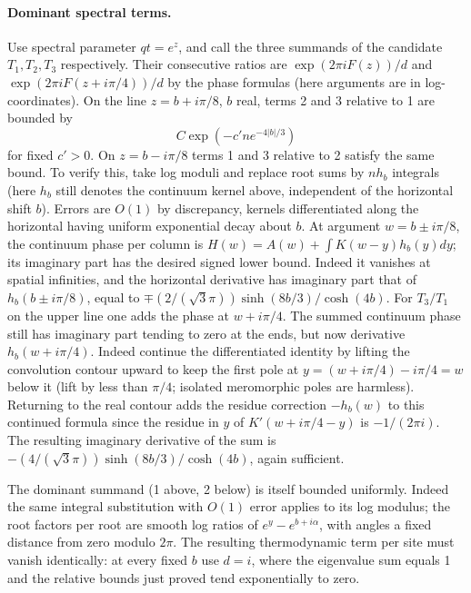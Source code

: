 \documentclass[11pt]{article}
\numberwithin{equation}{section}
\theoremstyle{definition}\newtheorem{definition}[theorem]{Definition}
\theoremstyle{remark}\newtheorem{remark}[theorem]{Remark}
\begin{document}
\paragraph{Dominant spectral terms.}
Use spectral parameter \(qt=e^z\), and call the three summands of the candidate \(T_1,T_2,T_3\) respectively. Their consecutive ratios are \(\exp(2\pi i F(z))/d\) and \(\exp(2\pi i F(z+i\pi/4))/d\) by the phase formulas (here arguments are in log-coordinates). On the line \(z=b+i\pi/8\), \(b\) real, terms 2 and 3 relative to 1 are bounded by
\[
 C\exp(-c' n e^{-4|b|/3})
\]
for fixed \(c'>0\). On \(z=b-i\pi/8\) terms 1 and 3 relative to 2 satisfy the same bound. To verify this, take log moduli and replace root sums by \(n h_b\) integrals (here \(h_b\) still denotes the continuum kernel above, independent of the horizontal shift \(b\)). Errors are \(O(1)\) by discrepancy, kernels differentiated along the horizontal having uniform exponential decay about \(b\). At argument \(w=b\pm i\pi/8\), the continuum phase per column is \(H(w)=A(w)+\int K(w-y)h_b(y)dy\); its imaginary part has the desired signed lower bound. Indeed it vanishes at spatial infinities, and the horizontal derivative has imaginary part that of \(h_b(b\pm i\pi/8)\), equal to \(\mp(2/(\sqrt3\pi))\sinh(8b/3)/\cosh(4b)\). For \(T_3/T_1\) on the upper line one adds the phase at \(w+i\pi/4\). The summed continuum phase still has imaginary part tending to zero at the ends, but now derivative \(h_b(w+i\pi/4)\). Indeed continue the differentiated identity by lifting the convolution contour upward to keep the first pole at \(y=(w+i\pi/4)-i\pi/4=w\) below it (lift by less than \(\pi/4\); isolated meromorphic poles are harmless). Returning to the real contour adds the residue correction \(-h_b(w)\) to this continued formula since the residue in \(y\) of \(K'(w+i\pi/4-y)\) is \(-1/(2\pi i)\). The resulting imaginary derivative of the sum is \(-(4/(\sqrt3\pi))\sinh(8b/3)/\cosh(4b)\), again sufficient.

The dominant summand (1 above, 2 below) is itself bounded uniformly. Indeed the same integral substitution with \(O(1)\) error applies to its log modulus; the root factors per root are smooth log ratios of \(e^y-e^{b+i\alpha}\), with angles a fixed distance from zero modulo \(2\pi\). The resulting thermodynamic term per site must vanish identically: at every fixed \(b\) use \(d=i\), where the eigenvalue sum equals 1 and the relative bounds just proved tend exponentially to zero.
\end{document}
